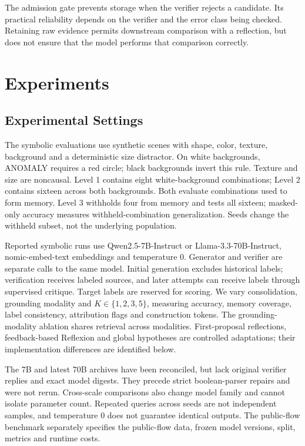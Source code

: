 \documentclass[onecolumn]{IEEEtran}
\numberwithin{equation}{section}
\theoremstyle{definition}
\theoremstyle{remark}
\begin{document}
The admission gate prevents storage when the verifier rejects a candidate. Its practical reliability depends on the verifier and the error class being checked. Retaining raw evidence permits downstream comparison with a reflection, but does not ensure that the model performs that comparison correctly.

\section{Experiments}

\subsection{Experimental Settings}
The symbolic evaluations use synthetic scenes with shape, color, texture, background and a deterministic size distractor. On white backgrounds, ANOMALY requires a red circle; black backgrounds invert this rule. Texture and size are noncausal. Level 1 contains eight white-background combinations; Level 2 contains sixteen across both backgrounds. Both evaluate combinations used to form memory. Level 3 withholds four from memory and tests all sixteen; masked-only accuracy measures withheld-combination generalization. Seeds change the withheld subset, not the underlying population.

Reported symbolic runs use Qwen2.5-7B-Instruct or Llama-3.3-70B-Instruct, nomic-embed-text embeddings and temperature $0$. Generator and verifier are separate calls to the same model. Initial generation excludes historical labels; verification receives labeled sources, and later attempts can receive labels through supervised critique. Target labels are reserved for scoring. We vary consolidation, grounding modality and $K\in\{1,2,3,5\}$, measuring accuracy, memory coverage, label consistency, attribution flags and construction tokens. The grounding-modality ablation shares retrieval across modalities. First-proposal reflections, feedback-based Reflexion and global hypotheses are controlled adaptations; their implementation differences are identified below.

The 7B and latest 70B archives have been reconciled, but lack original verifier replies and exact model digests. They precede strict boolean-parser repairs and were not rerun. Cross-scale comparisons also change model family and cannot isolate parameter count. Repeated queries across seeds are not independent samples, and temperature $0$ does not guarantee identical outputs. The public-flow benchmark separately specifies the public-flow data, frozen model versions, split, metrics and runtime costs.
\end{document}
